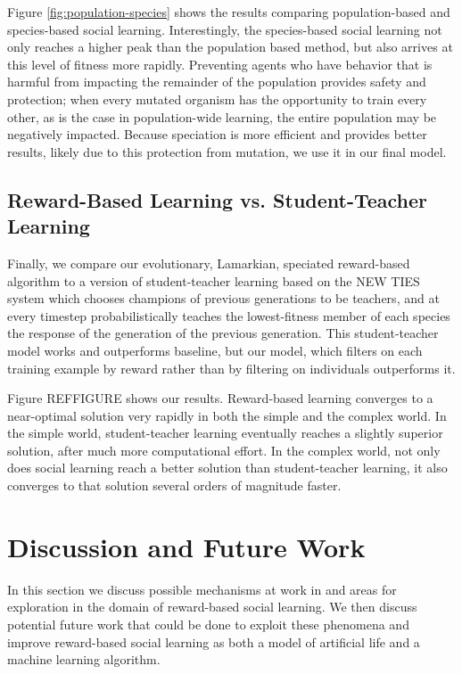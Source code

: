 \documentclass{acm_proc_article-sp}
\begin{document}
Figure \ref{fig:population-species} shows the results comparing population-based and species-based social learning. Interestingly, the species-based social learning not only reaches a higher peak than the population based method, but also arrives at this level of fitness more rapidly.  Preventing agents who have behavior that is harmful from impacting the remainder of the population provides safety and protection; when every mutated organism has the opportunity to train every other, as is the case in population-wide learning, the entire population may be negatively impacted.  Because speciation is more efficient and provides better results, likely due to this protection from mutation, we use it in our final model.


\subsection*{Reward-Based Learning vs. Student-Teacher Learning}
Finally, we compare our evolutionary, Lamarkian, speciated reward-based algorithm to a version of student-teacher learning based on the NEW TIES system \cite{haasdijk2008social} which chooses champions of previous generations to be teachers, and at every timestep probabilistically teaches the lowest-fitness member of each species the response of the generation of the previous generation.  This student-teacher model works and outperforms baseline, but our model, which filters on each training example by reward rather than by filtering on individuals outperforms it.

Figure REFFIGURE shows our results.  Reward-based learning converges to a near-optimal solution very rapidly in both the simple and the complex world.  In the simple world, student-teacher learning eventually reaches a slightly superior solution, after much more computational effort.  In the complex world, not only does social learning reach a better solution than student-teacher learning, it also converges to that solution several orders of magnitude faster.  

\section{Discussion and Future Work}
\label{sec:future}


In this section we discuss possible mechanisms at work in and areas for exploration in the domain of reward-based social learning.  We then discuss potential future work that could be done to exploit these phenomena and improve reward-based social learning as both a model of artificial life and a machine learning algorithm. 
\end{document}
